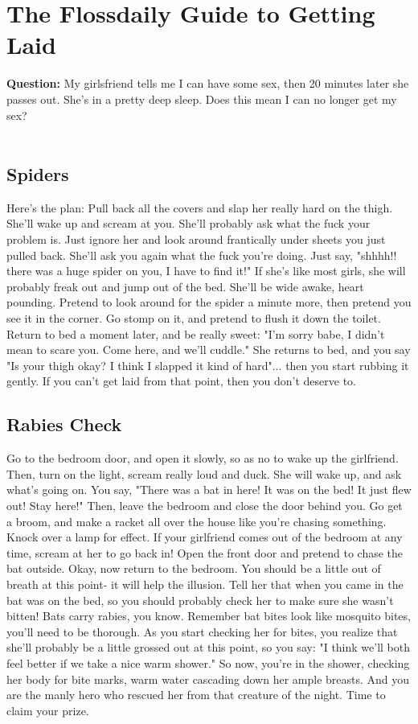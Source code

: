 \documentclass[a4paper]{article}
\begin{document}
\section{The Flossdaily Guide to Getting Laid}
\textbf{Question:} My girlsfriend tells me I can have some sex, then 20 minutes later she passes out. She's in a pretty deep sleep. Does this mean I can no longer get my sex? \\ \\

\subsection{Spiders}
Here's the plan:
Pull back all the covers and slap her really hard on the thigh.
She'll wake up and scream at you. She'll probably ask what the fuck your problem is.
Just ignore her and look around frantically under sheets you just pulled back.
She'll ask you again what the fuck you're doing.
Just say, "shhhh!! there was a huge spider on you, I have to find it!"
If she's like most girls, she will probably freak out and jump out of the bed. She'll be wide awake, heart pounding.
Pretend to look around for the spider a minute more, then pretend you see it in the corner. Go stomp on it, and pretend to flush it down the toilet.
Return to bed a moment later, and be really sweet: "I'm sorry babe, I didn't mean to scare you. Come here, and we'll cuddle."
She returns to bed, and you say "Is your thigh okay? I think I slapped it kind of hard"... then you start rubbing it gently.
If you can't get laid from that point, then you don't deserve to.

\subsection{Rabies Check}
Go to the bedroom door, and open it slowly, so as no to wake up the girlfriend.
Then, turn on the light, scream really loud and duck.
She will wake up, and ask what's going on.
You say, "There was a bat in here! It was on the bed! It just flew out! Stay here!"
Then, leave the bedroom and close the door behind you. Go get a broom, and make a racket all over the house like you're chasing something. Knock over a lamp for effect.
If your girlfriend comes out of the bedroom at any time, scream at her to go back in!
Open the front door and pretend to chase the bat outside.
Okay, now return to the bedroom. You should be a little out of breath at this point- it will help the illusion.
Tell her that when you came in the bat was on the bed, so you should probably check her to make sure she wasn't bitten! Bats carry rabies, you know. Remember bat bites look like mosquito bites, you'll need to be thorough.
As you start checking her for bites, you realize that she'll probably be a little grossed out at this point, so you say: "I think we'll both feel better if we take a nice warm shower."
So now, you're in the shower, checking her body for bite marks, warm water cascading down her ample breasts. And you are the manly hero who rescued her from that creature of the night. Time to claim your prize.
\end{document}
